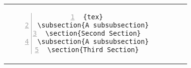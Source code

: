 \begin{table}[h!]
\begin{tabular}{c | c}
\begin{minipage}[m]{0.55\textwidth}
\begin{lstlisting}[numberstyle=\zebra{green!15}{yellow!15},numbers=left,basicstyle=\ttfamily\scriptsize]{tex}
\subsection{A subsubsection}
\section{Second Section}
\subsection{A subsubsection}
\section{Third Section}

\end{lstlisting}
\end{minipage}
\end{tabular}
\end{table}


